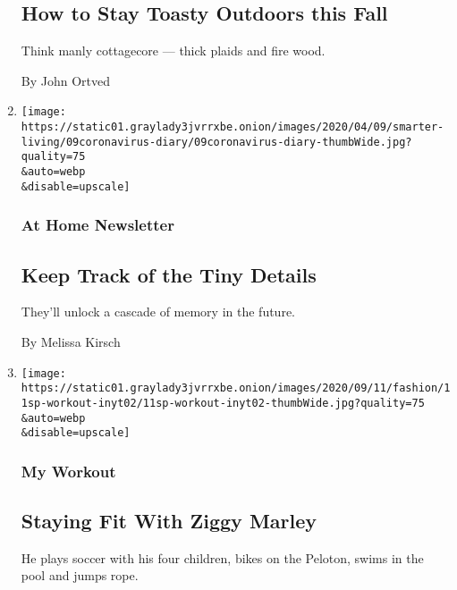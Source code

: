 \begin{enumerate}
  \hypertarget{how-to-stay-toasty-outdoors-this-fall-1}{%
  \subsection{How to Stay Toasty Outdoors this
  Fall}\label{how-to-stay-toasty-outdoors-this-fall-1}}

  Think manly cottagecore --- thick plaids and fire wood.

  By John Ortved
\item
  \href{/2020/09/11/at-home/newsletter.html}{}

  \texttt{[image: https://static01.graylady3jvrrxbe.onion/images/2020/04/09/smarter-living/09coronavirus-diary/09coronavirus-diary-thumbWide.jpg?quality=75\\\&auto=webp\\\&disable=upscale]}

  \hypertarget{at-home-newsletter}{%
  \subsubsection{At Home Newsletter}\label{at-home-newsletter}}

  \hypertarget{keep-track-of-the-tiny-details}{%
  \subsection{Keep Track of the Tiny
  Details}\label{keep-track-of-the-tiny-details}}

  They'll unlock a cascade of memory in the future.

  By Melissa Kirsch
\item
  \href{/2020/09/11/fashion/mens-style/staying-fit-with-ziggy-marley.html}{}

  \texttt{[image: https://static01.graylady3jvrrxbe.onion/images/2020/09/11/fashion/11sp-workout-inyt02/11sp-workout-inyt02-thumbWide.jpg?quality=75\\\&auto=webp\\\&disable=upscale]}

  \hypertarget{my-workout-1}{%
  \subsubsection{My Workout}\label{my-workout-1}}

  \hypertarget{staying-fit-with-ziggy-marley-1}{%
  \subsection{Staying Fit With Ziggy
  Marley}\label{staying-fit-with-ziggy-marley-1}}

  He plays soccer with his four children, bikes on the Peloton, swims in
  the pool and jumps rope.


\end{enumerate}
